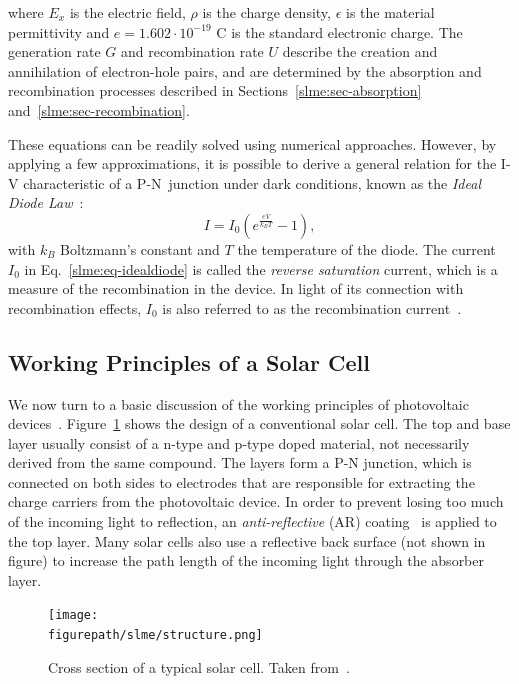 \begin{refsection}
\begin{enumerate}
\end{enumerate} 
where $E_x$ is the electric field, $\rho$ is the charge density, $\epsilon$ is 
the material permittivity and $e = 1.602\cdot 10^{-19}$ \si{\coulomb} is the standard 
electronic charge. The generation rate $G$ and recombination rate $U$ describe 
the creation and annihilation of electron-hole pairs, and are determined by 
the absorption and recombination processes described in 
Sections~\ref{slme:sec-absorption} and~\ref{slme:sec-recombination}.  
 
These equations can be readily solved using numerical approaches. However, by 
applying a few approximations, it is possible to derive a general relation for 
the I-V characteristic of a P-N~junction under dark conditions, known as the \textit{Ideal Diode 
Law}~\cite{Shockley1949}: 
\begin{equation}\label{slme:eq-idealdiode} 
I = I_0 (e^\frac{e V}{k_B T} - 1), 
\end{equation} 
with $k_B$ Boltzmann's constant and $T$ the temperature of the diode. The 
current $I_0$ in Eq.~\ref{slme:eq-idealdiode} is called the \textit{reverse 
saturation} current, which is a measure of the recombination in the device. In 
light of its connection with recombination effects, $I_0$ is also referred to 
as the recombination current~\cite{Cuevas2014}. 
 
\subsection{Working Principles of a Solar Cell} 
 
We now turn to a basic discussion of the working principles of photovoltaic 
devices~\cite{Fonash2010}. Figure~\ref{slme:fig-solarcell} shows the design of 
a conventional solar cell. The top and base layer usually consist of a n-type 
and p-type doped material, not necessarily derived from the same compound. The 
layers form a P-N junction, which is connected on both sides to electrodes 
that are responsible for extracting the charge carriers from the photovoltaic 
device. In order to prevent losing too much of the incoming light to 
reflection, an \textit{anti-reflective} (AR) coating~\cite{Swatowska2011} is 
applied to the top layer. Many solar cells also use a reflective back surface 
(not shown in figure) to increase the path length of the incoming light 
through the absorber layer. 
 
\begin{figure}[ht]  
\centering 
\captionsetup{width=0.8\textwidth}
\texttt{[image: \\figurepath/slme/structure.png]} 
\caption{\label{slme:fig-solarcell} Cross section of a typical solar cell. 
Taken from~\cite{Fonash2010}.} 
\end{figure} 


\end{refsection}
